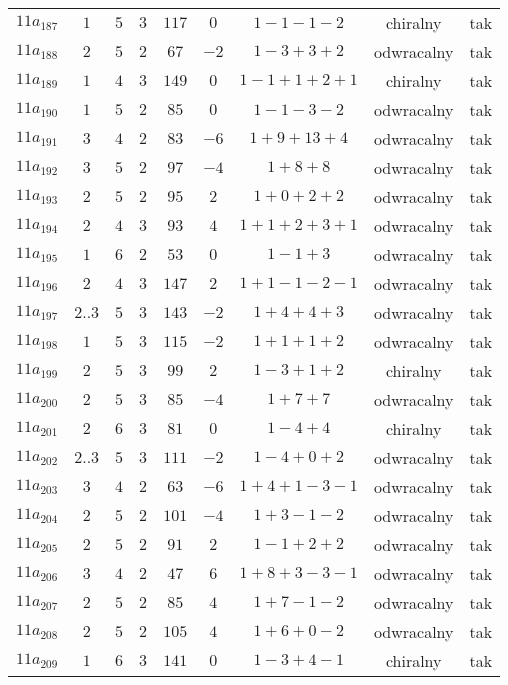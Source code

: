\begin{longtable}{ccccccccc}
$11a_{187}$ & $1$ & $5$ & $3$ & $117$ & $0$ & $1-1-1-2$ & chiralny & tak \\
$11a_{188}$ & $2$ & $5$ & $2$ & $67$ & $-2$ & $1-3+3+2$ & odwracalny & tak \\
$11a_{189}$ & $1$ & $4$ & $3$ & $149$ & $0$ & $1-1+1+2+1$ & chiralny & tak \\
$11a_{190}$ & $1$ & $5$ & $2$ & $85$ & $0$ & $1-1-3-2$ & odwracalny & tak \\
$11a_{191}$ & $3$ & $4$ & $2$ & $83$ & $-6$ & $1+9+13+4$ & odwracalny & tak \\
$11a_{192}$ & $3$ & $5$ & $2$ & $97$ & $-4$ & $1+8+8$ & odwracalny & tak \\
$11a_{193}$ & $2$ & $5$ & $2$ & $95$ & $2$ & $1+0+2+2$ & odwracalny & tak \\
$11a_{194}$ & $2$ & $4$ & $3$ & $93$ & $4$ & $1+1+2+3+1$ & odwracalny & tak \\
$11a_{195}$ & $1$ & $6$ & $2$ & $53$ & $0$ & $1-1+3$ & odwracalny & tak \\
$11a_{196}$ & $2$ & $4$ & $3$ & $147$ & $2$ & $1+1-1-2-1$ & odwracalny & tak \\
$11a_{197}$ & $2..3$ & $5$ & $3$ & $143$ & $-2$ & $1+4+4+3$ & odwracalny & tak \\
$11a_{198}$ & $1$ & $5$ & $3$ & $115$ & $-2$ & $1+1+1+2$ & odwracalny & tak \\
$11a_{199}$ & $2$ & $5$ & $3$ & $99$ & $2$ & $1-3+1+2$ & chiralny & tak \\
$11a_{200}$ & $2$ & $5$ & $3$ & $85$ & $-4$ & $1+7+7$ & odwracalny & tak \\
$11a_{201}$ & $2$ & $6$ & $3$ & $81$ & $0$ & $1-4+4$ & chiralny & tak \\
$11a_{202}$ & $2..3$ & $5$ & $3$ & $111$ & $-2$ & $1-4+0+2$ & odwracalny & tak \\
$11a_{203}$ & $3$ & $4$ & $2$ & $63$ & $-6$ & $1+4+1-3-1$ & odwracalny & tak \\
$11a_{204}$ & $2$ & $5$ & $2$ & $101$ & $-4$ & $1+3-1-2$ & odwracalny & tak \\
$11a_{205}$ & $2$ & $5$ & $2$ & $91$ & $2$ & $1-1+2+2$ & odwracalny & tak \\
$11a_{206}$ & $3$ & $4$ & $2$ & $47$ & $6$ & $1+8+3-3-1$ & odwracalny & tak \\
$11a_{207}$ & $2$ & $5$ & $2$ & $85$ & $4$ & $1+7-1-2$ & odwracalny & tak \\
$11a_{208}$ & $2$ & $5$ & $2$ & $105$ & $4$ & $1+6+0-2$ & odwracalny & tak \\
$11a_{209}$ & $1$ & $6$ & $3$ & $141$ & $0$ & $1-3+4-1$ & chiralny & tak \\

\end{longtable}
